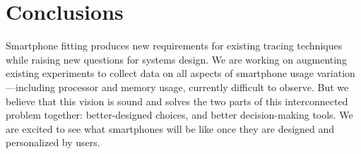 \section{Conclusions}
\label{sec-conclusions}

Smartphone fitting produces new requirements for existing tracing techniques
while raising new questions for systems design. We are working on augmenting
existing \PhoneLab{} experiments to collect data on all aspects of smartphone
usage variation---including processor and memory usage, currently difficult to observe. But we believe that this vision is sound and solves the two parts
of this interconnected problem together: better-designed choices, and
better decision-making tools. We are excited to see what smartphones will be
like once they are designed and personalized by users.
